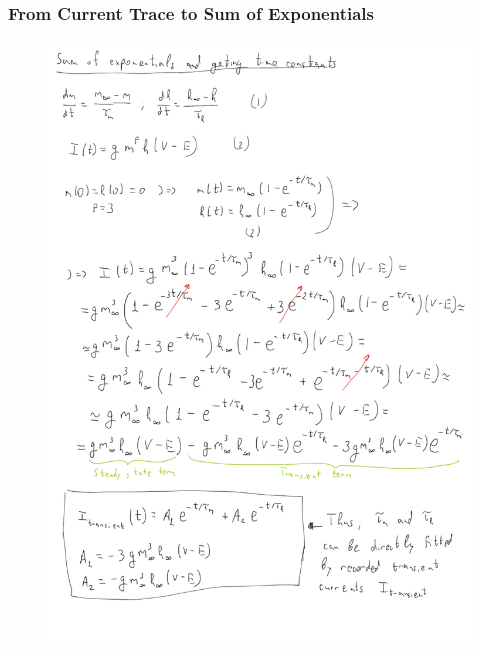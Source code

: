 \documentclass[../../workflow.tex]{subfiles}
\begin{document}
\subsubsection{From Current Trace to Sum of Exponentials}\label{appendix_from_current_to_exp_sum}
\begin{figure}[H]
    \centering
    \includegraphics[height=0.9\textheight]{Handwritten Notes/R5 Model/Z1 - Double exponential fit to transient current.pdf}
\end{figure}

\newpage
\end{document}
